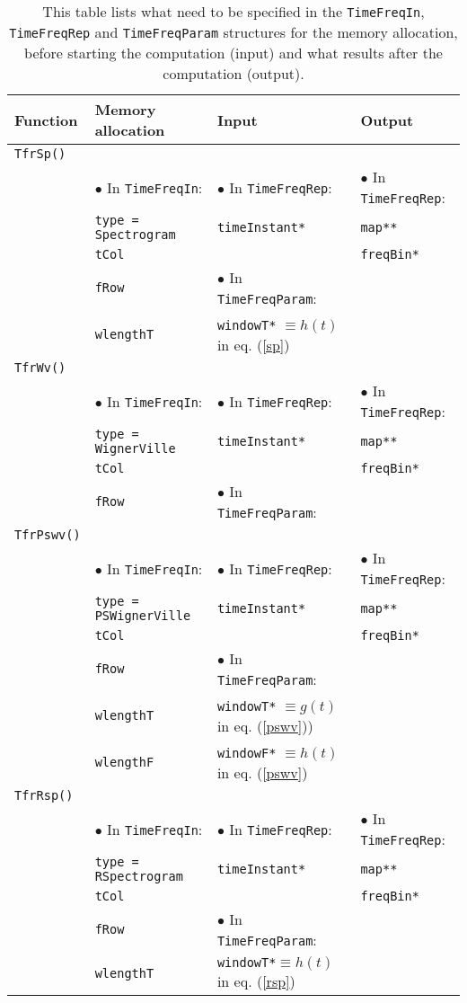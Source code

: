 \documentclass{article}
\begin{document}
\begin{table}
\begin{tabular}{|l||l|l|l|}
\hline
Function & Memory allocation & Input & Output\\
\hline
\texttt{TfrSp()} & & &\\
& $\bullet$ In \texttt{TimeFreqIn}: & $\bullet$ In \texttt{TimeFreqRep}:  &$\bullet$ In \texttt{TimeFreqRep}:\\
& \texttt{type = Spectrogram} & \texttt{timeInstant*} & \texttt{map**} \\
&\texttt{tCol} &  & \texttt{freqBin*} \\
& \texttt{fRow} &$\bullet$ In \texttt{TimeFreqParam}:&\\
& \texttt{wlengthT}& \texttt{windowT*} $\equiv h(t)$ in eq. (\ref{sp})&\\
\hline
\texttt{TfrWv()} & & &\\
& $\bullet$ In \texttt{TimeFreqIn}:& $\bullet$ In \texttt{TimeFreqRep}:  &$\bullet$ In \texttt{TimeFreqRep}:\\
& \texttt{type = WignerVille} & \texttt{timeInstant*} & \texttt{map**} \\
& \texttt{tCol} & & \texttt{freqBin*} \\
& \texttt{fRow} & $\bullet$ In \texttt{TimeFreqParam}:& \\
\hline
\texttt{TfrPswv()} & & &\\
& $\bullet$ In \texttt{TimeFreqIn}: & $\bullet$ In \texttt{TimeFreqRep}:  & $\bullet$ In \texttt{TimeFreqRep}:\\
& \texttt{type = PSWignerVille} & \texttt{timeInstant*} & \texttt{map**} \\
&\texttt{tCol} & & \texttt{freqBin*} \\
& \texttt{fRow} &$\bullet$ In \texttt{TimeFreqParam}:&\\
& \texttt{wlengthT} &\texttt{windowT*} $\equiv g(t)$ in eq. (\ref{pswv}))&\\
& \texttt{wlengthF} &\texttt{windowF*} $\equiv h(t)$ in eq. (\ref{pswv})&\\
\hline
\texttt{TfrRsp()} & & &\\
& $\bullet$ In \texttt{TimeFreqIn}: & $\bullet$ In \texttt{TimeFreqRep}:  &$\bullet$ In \texttt{TimeFreqRep}:\\
& \texttt{type = RSpectrogram} & \texttt{timeInstant*} & \texttt{map**} \\
&\texttt{tCol} & & \texttt{freqBin*} \\
& \texttt{fRow} & $\bullet$ In \texttt{TimeFreqParam}:&\\
& \texttt{wlengthT}& \texttt{windowT*}$ \equiv h(t)$ in eq. (\ref{rsp})&\\
\hline
\end{tabular}
\caption{\label{tfr_tablea} This table lists what need to be specified in the
\texttt{TimeFreqIn}, \texttt{TimeFreqRep} and \texttt{TimeFreqParam}
structures for the memory allocation, before starting the computation
(input)  and what results after the computation (output).}
\end{table}
\end{document}
